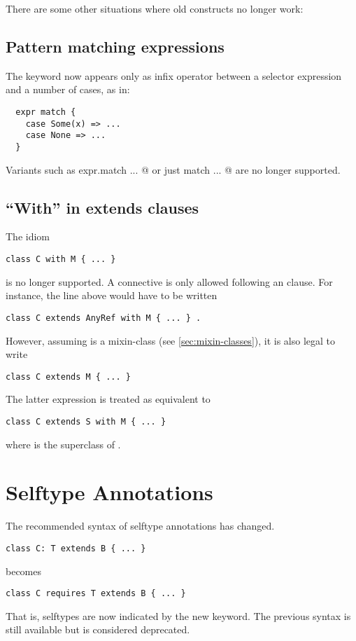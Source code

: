 \documentclass[a4paper,11pt,twoside]{article}
\begin{document}
There are some other situations where old constructs no longer work:

\subsection*{Pattern matching expressions} 

The \lstinline@match@
keyword now appears only as infix operator between a selector
expression and a number of cases, as in:
\begin{lstlisting}
  expr match {
    case Some(x) => ...
    case None => ...
  }
\end{lstlisting}
Variants such as \lstinline@ expr.match {...} @ 
or just
\lstinline@ match {...} @
are no longer supported.

\subsection*{``With'' in extends clauses}

The idiom
\begin{lstlisting}
class C with M { ... }
\end{lstlisting}
is no longer supported. A \lstinline@with@ connective is only allowed
following an \lstinline@extends@ clause. For instance, the line
above would have to be written
\begin{lstlisting}
class C extends AnyRef with M { ... } .
\end{lstlisting}
However, assuming \lstinline@M@ is a mixin-class (see
\ref{sec:mixin-classes}), it is also legal to write
\begin{lstlisting}
class C extends M { ... }
\end{lstlisting}
The latter expression is treated as equivalent to
\begin{lstlisting}
class C extends S with M { ... }
\end{lstlisting}
where \lstinline@S@ is the superclass of \lstinline@M@.

\section{Selftype Annotations}

The recommended syntax of selftype annotations has changed. 
\begin{lstlisting}
class C: T extends B { ... }
\end{lstlisting}
becomes
\begin{lstlisting}
class C requires T extends B { ... }
\end{lstlisting}
That is, selftypes are now indicated by the new \lstinline@requires@
keyword. The previous syntax is still available but is considered deprecated. 
\end{document}
